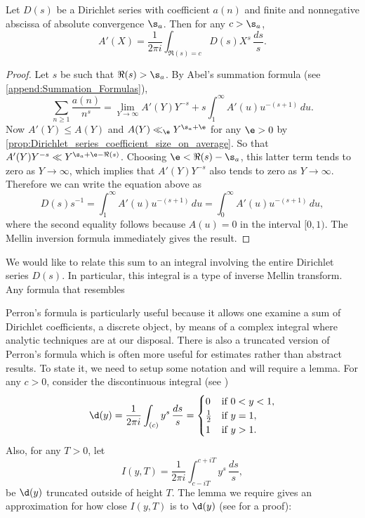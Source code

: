       \begin{theorem}
        Let $D(s)$ be a Dirichlet series with coefficient $a(n)$ and finite and nonnegative abscissa of absolute convergence $\s_{a}$. Then for any $c > \s_{a}$,
        \[
          A'(X) = \frac{1}{2\pi i}\int_{\Re(s) = c}D(s)X^{s}\,\frac{ds}{s}.
        \]
      \end{theorem}
      \begin{proof}
        Let $s$ be such that $\Re(s) > \s_{a}$. By Abel's summation formula (see \cref{append:Summation_Formulas}),
        \[
          \sum_{n \ge 1}\frac{a(n)}{n^{s}} = \lim_{Y \to \infty}A'(Y)Y^{-s}+s\int_{1}^{\infty}A'(u)u^{-(s+1)}\,du.
        \]
        Now $A'(Y) \le A(Y)$ and $A(Y) \ll_{\e} Y^{\s_{a}+\e}$ for any $\e > 0$ by \cref{prop:Dirichlet_series_coefficient_size_on_average}. So that $A'(Y)Y^{-s} \ll Y^{\s_{a}+\e-\Re(s)}$. Choosing $\e < \Re(s)-\s_{a}$, this latter term tends to zero as $Y \to \infty$, which implies that $A'(Y)Y^{-s}$ also tends to zero as $Y \to \infty$. Therefore we can write the equation above as
        \[
          D(s)s^{-1} = \int_{1}^{\infty}A'(u)u^{-(s+1)}\,du = \int_{0}^{\infty}A'(u)u^{-(s+1)}\,du,
        \]
        where the second equality follows because $A(u) = 0$ in the interval $[0,1)$. The Mellin inversion formula immediately gives the result.
      \end{proof}

      We would like to relate this sum to an integral involving the entire Dirichlet series $D(s)$. In particular, this integral is a type of inverse Mellin transform. Any formula that resembles  

      Perron's formula is particularly useful because it allows one examine a sum of Dirichlet coefficients, a discrete object, by means of a complex integral where analytic techniques are at our disposal. There is also a truncated version of Perron's formula which is often more useful for estimates rather than abstract results. To state it, we need to setup some notation and will require a lemma. For any $c > 0$, consider the discontinuous integral (see \cite{davenport1980multiplicative})
      \[
        \d(y) = \frac{1}{2\pi i}\int_{(c)}y^{s}\,\frac{ds}{s} = \begin{cases} 0 & \text{if $0 < y < 1$}, \\ \frac{1}{2} & \text{if $y = 1$}, \\ 1 & \text{if $y > 1$}. \end{cases}
      \]
      Also, for any $T > 0$, let
      \[
        I(y,T) = \frac{1}{2\pi i}\int_{c-iT}^{c+iT}y^{s}\,\frac{ds}{s},
      \]
      be $\d(y)$ truncated outside of height $T$. The lemma we require gives an approximation for how close $I(y,T)$ is to $\d(y)$ (see \cite{davenport1980multiplicative} for a proof):

